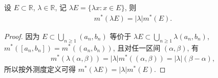 \documentclass[../../main.tex]{subfiles}%
\begin{document}
\begin{theorem}[外测度的数乘]\label{theorem:外测度的数乘}
设 \(E \subset \mathbb{R}\), \(\lambda \in \mathbb{R}\), 记 \(\lambda E = \{ \lambda x : x \in E\}\), 则
\begin{align*}
m^*(\lambda E) = |\lambda| m^*(E).
\end{align*}
\end{theorem}
\begin{proof}

因为 \(E \subset \bigcup_{n \geqslant  1} (a_n, b_n)\) 等价于 \(\lambda E \subset \bigcup_{n \geqslant  1} \lambda (a_n, b_n)\), \(m^*([a_n, b_n]) = m^*((a_n, b_n))\), 且对任一区间 \((\alpha, \beta)\), 有
\begin{align*}
m^*(\lambda (\alpha, \beta)) = |\lambda| m^*((\alpha, \beta)) = |\lambda| (\beta - \alpha),
\end{align*}
所以按外测度定义可得 \(m^*(\lambda E) = |\lambda| m^*(E)\). 

\end{proof}
\end{document}
